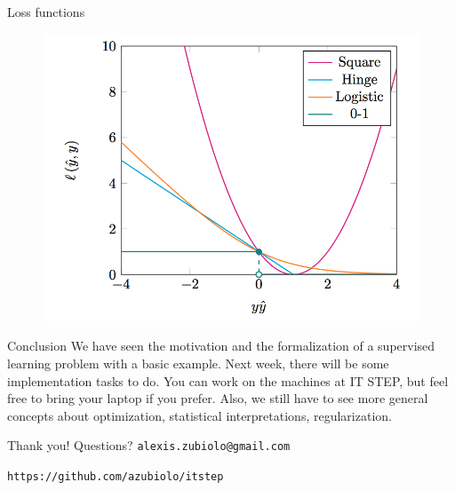\documentclass{beamer}
\newcommand{\1}[1]{\mathbbm{1}\left[#1\right]}
\begin{document}
\begin{frame}{Loss functions}
\begin{figure}
\centering
\includegraphics[width=\linewidth]{images/losses.png}
\end{figure}
\end{frame}

\begin{frame}{Conclusion}
We have seen the motivation and the formalization of a supervised learning problem with a basic example.
\vfill
\pause
Next week, there will be some implementation tasks to do. You can work on the machines at IT STEP, but feel free to bring your laptop if you prefer.
\vfill
\pause
Also, we still have to see more general concepts about optimization, statistical interpretations, regularization.
\end{frame}

\begin{frame}
\vfill
\centering
\begin{huge}
\huge{Thank you! Questions?}
\vfill
\texttt{alexis.zubiolo@gmail.com}
\end{huge}
\vfill
\begin{Large}
\texttt{https://github.com/azubiolo/itstep}
\end{Large}
\vfill
\end{frame}
\end{document}
